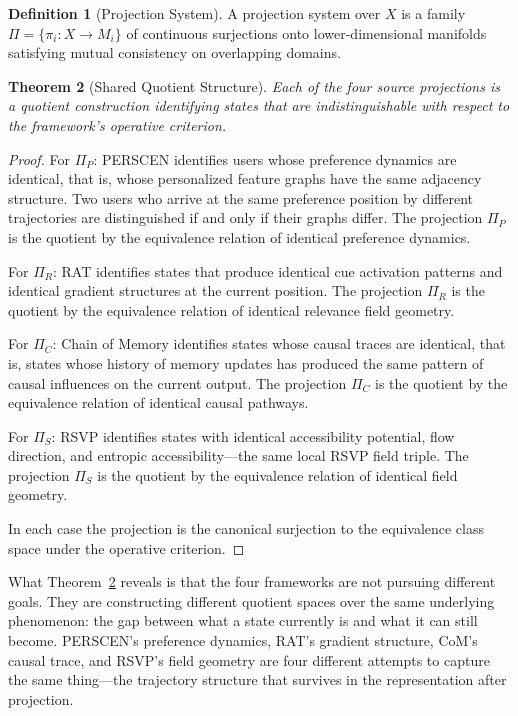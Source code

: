 \documentclass[12pt, oneside]{book}
\theoremstyle{flyxion}
\newtheorem{theorem}{Theorem}[chapter]
\theoremstyle{definition}
\newtheorem{definition}[theorem]{Definition}
\begin{document}
\begin{definition}[Projection System]
A projection system over $X$ is a family $\Pi = \{\pi_i : X \to M_i\}$
of continuous surjections onto lower-dimensional manifolds satisfying
mutual consistency on overlapping domains.
\end{definition}

\begin{theorem}[Shared Quotient Structure]
\label{thm:shared_quotient}
Each of the four source projections is a quotient construction
identifying states that are indistinguishable with respect to the
framework's operative criterion.
\end{theorem}

\begin{proof}
For $\Pi_P$: PERSCEN identifies users whose preference dynamics are
identical, that is, whose personalized feature graphs have the same
adjacency structure. Two users who arrive at the same preference
position by different trajectories are distinguished if and only if
their graphs differ. The projection $\Pi_P$ is the quotient by the
equivalence relation of identical preference dynamics.

For $\Pi_R$: RAT identifies states that produce identical cue
activation patterns and identical gradient structures at the current
position. The projection $\Pi_R$ is the quotient by the equivalence
relation of identical relevance field geometry.

For $\Pi_C$: Chain of Memory identifies states whose causal traces
are identical, that is, states whose history of memory updates has
produced the same pattern of causal influences on the current output.
The projection $\Pi_C$ is the quotient by the equivalence relation of
identical causal pathways.

For $\Pi_S$: RSVP identifies states with identical accessibility
potential, flow direction, and entropic accessibility---the same local
RSVP field triple. The projection $\Pi_S$ is the quotient by the
equivalence relation of identical field geometry.

In each case the projection is the canonical surjection to the
equivalence class space under the operative criterion.
\end{proof}

What Theorem~\ref{thm:shared_quotient} reveals is that the four
frameworks are not pursuing different goals. They are constructing
different quotient spaces over the same underlying phenomenon: the
gap between what a state currently is and what it can still become.
PERSCEN's preference dynamics, RAT's gradient structure, CoM's causal
trace, and RSVP's field geometry are four different attempts to capture
the same thing---the trajectory structure that survives in the
representation after projection.
\end{document}
